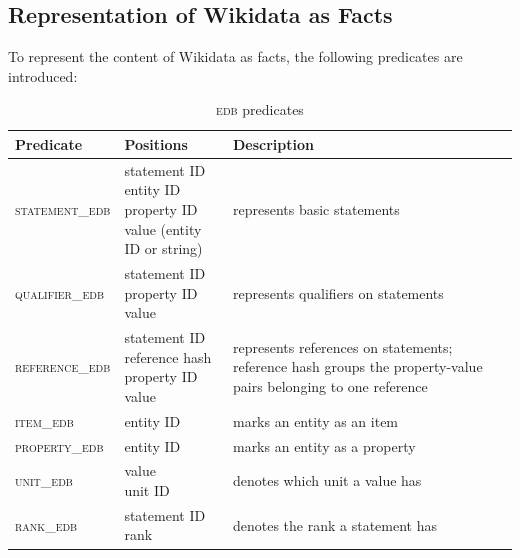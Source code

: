 \documentclass[hyperref,bachelorofscience,fleqn]{cgvpub}
\begin{document}
\subsection{Representation of Wikidata as Facts}\label{subsec_representation}
To represent the content of Wikidata as facts, the following predicates are introduced:
\begin{table}[H]
\caption{\textsc{edb} predicates}\label{tab_predicates}
\begin{tabular}{llp{8cm}}
Predicate & Positions & Description \\
\hline
\textsc{statement\_edb} & \makecell{statement ID \\ entity ID \\ property ID \\ value (entity ID or string)} & represents basic statements \\
\hline
\textsc{qualifier\_edb} & \makecell{statement ID \\ property ID \\ value} & represents qualifiers on statements \\
\hline
\textsc{reference\_edb} & \makecell{statement ID \\ reference hash \\ property ID \\ value} & represents references on statements; reference hash groups the property-value pairs belonging to one reference \\
\hline
\textsc{item\_edb} & entity ID & marks an entity as an item \\
\textsc{property\_edb} & entity ID & marks an entity as a property \\
\hline
\textsc{unit\_edb} & \makecell{value \\ unit ID} & denotes which unit a value has \\
\hline
\textsc{rank\_edb} & \makecell{statement ID \\ rank} & denotes the rank a statement has
\end{tabular}
\end{table}
\end{document}
